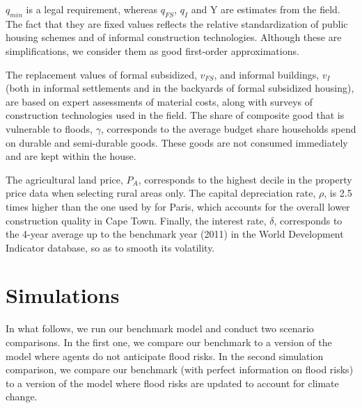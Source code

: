 \documentclass[12pt]{article}
\begin{document}
$q_{min}$ is a legal requirement, whereas $q_{FS}$, $q_I$ and Y are estimates from the field. The fact that they are fixed values reflects the relative standardization of public housing schemes and of informal construction technologies. Although these are simplifications, we consider them as good first-order approximations.

The replacement values of formal subsidized, $v_{FS}$, and informal buildings, $v_{I}$ (both in informal settlements and in the backyards of formal subsidized housing), are based on expert assessments of material costs, along with surveys of construction technologies used in the field. The share of composite good that is vulnerable to floods, $\gamma$, corresponds to the average budget share households spend on durable and semi-durable goods. These goods are not consumed immediately and are kept within the house.

The agricultural land price, $P_A$, corresponds to the highest decile in the property price data when selecting rural areas only. The capital depreciation rate, $\rho$, is 2.5 times higher than the one used by \citet{Viguie2014DownscalingParis} for Paris, which accounts for the overall lower construction quality in Cape Town. Finally, the interest rate, $\delta$, corresponds to the 4-year average up to the benchmark year (2011) in the World Development Indicator database, so as to smooth its volatility.




\section{Simulations \label{sec:results}}

In what follows, we run our benchmark model and conduct two scenario comparisons. In the first one, we compare our benchmark to a version of the model where agents do not anticipate flood risks.  In the second simulation comparison, we compare our benchmark (with perfect information on flood risks) to a version of the model where flood risks are updated to account for climate change.%
\end{document}
